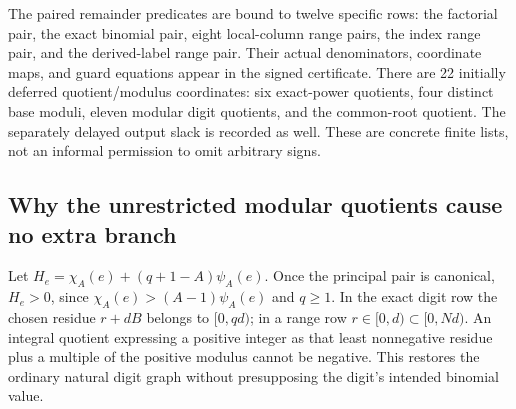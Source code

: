 The paired remainder predicates are bound to twelve specific rows: the factorial pair, the exact binomial pair, eight local-column range pairs, the index range pair, and the derived-label range pair. Their actual denominators, coordinate maps, and guard equations appear in the signed certificate. There are 22 initially deferred quotient/modulus coordinates: six exact-power quotients, four distinct base moduli, eleven modular digit quotients, and the common-root quotient. The separately delayed output slack is recorded as well. These are concrete finite lists, not an informal permission to omit arbitrary signs.

\subsection{Why the unrestricted modular quotients cause no extra branch}

Let $H_e=\chi_A(e)+(q+1-A)\psi_A(e)$. Once the principal pair is canonical, $H_e>0$, since $\chi_A(e)>(A-1)\psi_A(e)$ and $q\ge1$. In the exact digit row the chosen residue $r+dB$ belongs to $[0,qd)$; in a range row $r\in[0,d)\subset[0,Nd)$. An integral quotient expressing a positive integer as that least nonnegative residue plus a multiple of the positive modulus cannot be negative. This restores the ordinary natural digit graph without presupposing the digit's intended binomial value.
